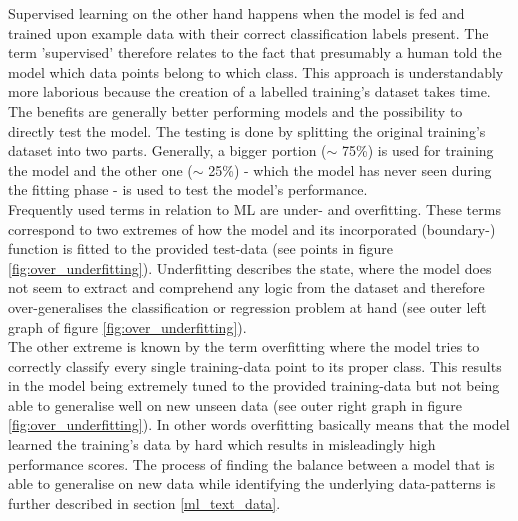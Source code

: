 Supervised learning on the other hand happens when the model is fed and trained upon example data with their correct classification labels present. The term 'supervised' therefore relates to the fact that presumably a human told the model which data points belong to which class. This approach is understandably more laborious because the creation of a labelled training's dataset takes time. The benefits are generally better performing models and the possibility to directly test the model. The testing is done by splitting the original training's dataset into two parts. Generally, a bigger portion ($\sim$ 75\%) is used for training the model and the other one ($\sim$ 25\%) - which the model has never seen during the fitting phase - is used to test the model's performance. \\
\newline
Frequently used terms in relation to ML are under- and overfitting. These terms correspond to two extremes of how the model and its incorporated (boundary-) function is fitted to the provided test-data (see points in figure \ref{fig:over_underfitting}). Underfitting describes the state, where the model does not seem to extract and comprehend any logic from the dataset and therefore over-generalises the classification or regression problem at hand (see outer left graph of figure \ref{fig:over_underfitting}). \\
The other extreme is known by the term overfitting where the model tries to correctly classify every single training-data point to its proper class. This results in the model being extremely tuned to the provided training-data but not being able to generalise well on new unseen data (see outer right graph in figure \ref{fig:over_underfitting}). In other words overfitting basically means that the model learned the training's data by hard which results in misleadingly high performance scores. The process of finding the balance between a model that is able to generalise on new data while identifying the underlying data-patterns is further described in section \ref{ml_text_data}.







